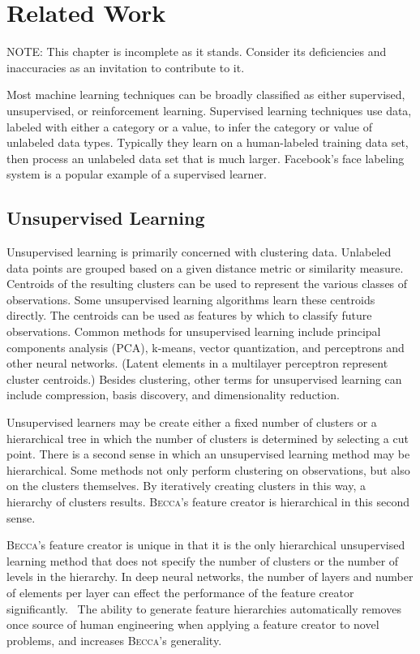 \chapter{Related Work}

NOTE: This chapter is incomplete as it stands. Consider its deficiencies and inaccuracies as an invitation to contribute to it.

Most machine learning techniques can be broadly classified as either supervised, unsupervised, or reinforcement learning. Supervised learning techniques use data, labeled with either a category or a value, to infer the category or value of unlabeled data types. Typically they learn on a human-labeled training data set, then process an unlabeled data set that is much larger. Facebook's face labeling system is a popular example of a supervised learner.

\section{Unsupervised Learning}
Unsupervised learning is primarily concerned with clustering data. Unlabeled data points are grouped based on a given distance metric or similarity measure. Centroids of the resulting clusters can be used to represent the various classes of observations. Some unsupervised learning algorithms learn these centroids directly. The centroids can be used as features by which to classify future observations. Common methods for unsupervised learning include principal components analysis (PCA), k-means, vector quantization, and perceptrons and other neural networks. (Latent elements in a multilayer perceptron represent cluster centroids.) Besides clustering, other terms for unsupervised learning can include compression, basis discovery, and dimensionality reduction.

Unsupervised learners may be create either a fixed number of clusters or a hierarchical tree in which the number of clusters is determined by selecting a cut point. There is a second sense in which an unsupervised learning method may be hierarchical. Some methods not only perform clustering on observations, but also on the clusters themselves. By iteratively creating clusters in this way, a hierarchy of clusters results. \textsc{Becca}'s feature creator is hierarchical in this second sense.

\textsc{Becca}'s feature creator is unique in that it is the only hierarchical unsupervised learning method that does not specify the number of clusters or the number of levels in the hierarchy. In deep neural networks, the number of layers and number of elements per layer can effect the performance of the feature creator significantly.~\cite{montavon11} The ability to generate feature hierarchies automatically removes once source of human engineering when applying a feature creator to novel problems, and increases \textsc{Becca}'s generality.

